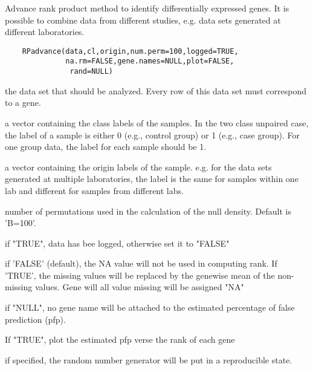 \begin{Description}\relax
Advance rank product method to identify 
differentially expressed genes. It is possible to
combine data from different studies, e.g. data sets 
generated at different laboratories.
\end{Description}
\begin{Usage}
\begin{verbatim}
    RPadvance(data,cl,origin,num.perm=100,logged=TRUE,
              na.rm=FALSE,gene.names=NULL,plot=FALSE, 
               rand=NULL)
\end{verbatim}
\end{Usage}
\begin{Arguments}
\begin{ldescription}
\item[\code{data}] the data set that should be analyzed. Every
row of this data set must correspond to a gene.
\item[\code{cl}] a vector containing the class labels of the 
samples. In the two class unpaired case, the label 
of a sample is either 0 (e.g., control group) or 1 
(e.g., case group). For one group data, the label for 
each sample should be 1.
\item[\code{origin}] a vector containing the origin labels of the 
sample. e.g. for 
the data sets generated at multiple laboratories, the label
is the same for samples within one lab and different for samples 
from different labs. 
\item[\code{num.perm}] number of permutations used in the calculation 
of the null density. Default is 'B=100'.
\item[\code{logged}] if "TRUE", data has bee logged, otherwise set 
it to "FALSE"
\item[\code{na.rm}] if 'FALSE' (default), the NA value will not
be used in computing rank. If 'TRUE', the missing 
values will be replaced by the genewise mean of
the non-missing values. Gene will all value missing 
will be assigned "NA"
\item[\code{gene.names}] if "NULL", no gene name will be attached 
to the estimated percentage of false prediction (pfp). 
\item[\code{plot}] If "TRUE", plot the estimated pfp verse the rank 
of each gene
\item[\code{rand}] if specified, the random number generator 
will be put in a  reproducible state.
\end{ldescription}
\end{Arguments}
